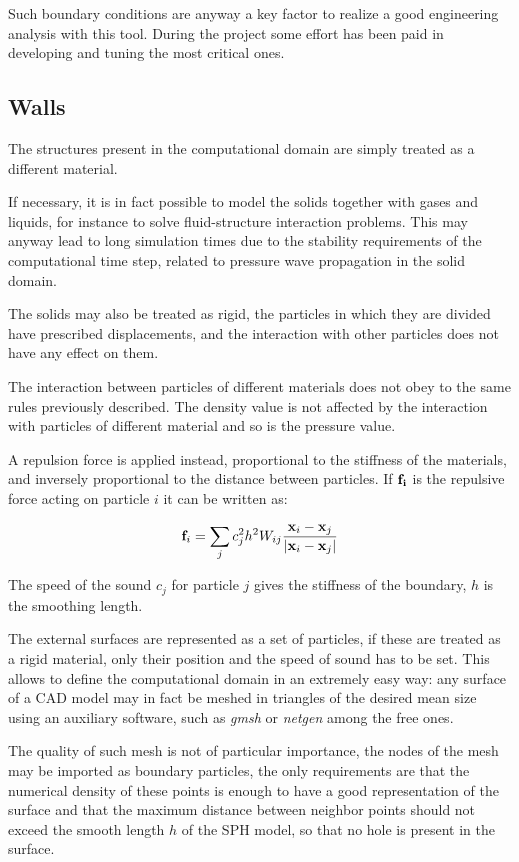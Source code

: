 \documentclass[a4paper, 11pt, twocolumn]{article}
\begin{document}
Such boundary conditions are anyway a key factor to realize a good engineering analysis with this tool. During the project some effort has been paid in developing and tuning the most critical ones.

\subsection{Walls}
The structures present in the computational domain are simply treated as a different material. 

If necessary, it is in fact possible to model the solids together with gases and liquids, for instance to solve fluid-structure interaction problems. This may anyway lead to long simulation times due to the stability requirements of the computational time step, related to pressure wave propagation in the solid domain.

The solids may also be treated as rigid, the particles in which they are divided have prescribed displacements, and the interaction with other particles does not have any effect on them.

The interaction between particles of different materials does not obey to the same rules previously described. The density value is not affected by the interaction with particles of different material and so is the pressure value.

A repulsion force is applied instead, proportional to the stiffness of the materials, and inversely proportional to the distance between particles. If $\bf{f}_i$ is the repulsive force acting on particle $i$ it can be written as:

\begin{equation}
{\bf f}_i = \sum_j c_j^2 h^2 W_{ij} \frac{{\bf x}_i - {\bf x}_j}{|{\bf x}_i - {\bf x}_j|}
\end{equation}

The speed of the sound $c_j$ for particle $j$ gives the stiffness of the boundary, $h$ is the smoothing length.

The external surfaces are represented as a set of particles, if these are treated as a rigid material, only their position and the speed of sound has to be set. This allows to define the computational domain in an extremely easy way: any surface of a CAD model may in fact be meshed in triangles of the desired mean size using an auxiliary software, such as {\it gmsh} or {\it netgen} among the free ones.

The quality of such mesh is not of particular importance, the nodes of the mesh may be imported as boundary particles, the only requirements are that the numerical density of these points is enough to have a good representation of the surface and that the maximum distance between neighbor points should not exceed the smooth length $h$ of the SPH model, so that no hole is present in the surface.
\end{document}
